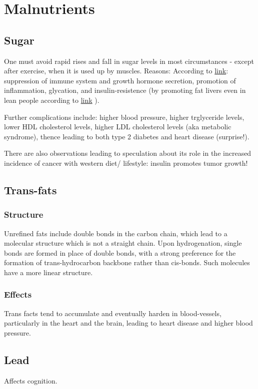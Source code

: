 \documentclass[oneside, article]{memoir}
\begin{document}
\section{Malnutrients}
\subsection{Sugar}
One must avoid rapid rises and fall in sugar levels in most circumstances - except after exercise, when it is used up by muscles. Reasons: According to  \href{http://nutritiondiva.quickanddirtytips.com/how-sugar-affects-your-body.aspx}{link}: suppression of immune system and growth hormone secretion, promotion of inflammation, glycation, and insulin-resistence (by promoting fat livers even in lean people according to \href{http://www.nytimes.com/2011/04/17/magazine/mag-17Sugar-t.html?_r=1}{link} ).

Further complications include: higher blood pressure, higher trglyceride levels, lower HDL cholesterol levels, higher LDL cholesterol levels (aka metabolic syndrome), thence leading to both type 2 diabetes and heart disease (surprise!). 

There are also observations leading to speculation about its role in the increased incidence of cancer with western diet/ lifestyle: insulin promotes tumor growth!

\subsection{Trans-fats}
\subsubsection{Structure}
Unrefined fats include double bonds in the carbon chain, which lead to a molecular structure which is not a straight chain. Upon hydrogenation, single bonds are formed in place of double bonds, with a strong preference for the formation of trans-hydrocarbon backbone rather than cis-bonds. Such molecules have a more linear structure.

\subsubsection{Effects}
Trans facts tend to accumulate and eventually harden in blood-vessels, particularly in the heart and the brain, leading to heart disease and higher blood pressure.

\subsection{Lead}
Affects cognition.
\end{document}
